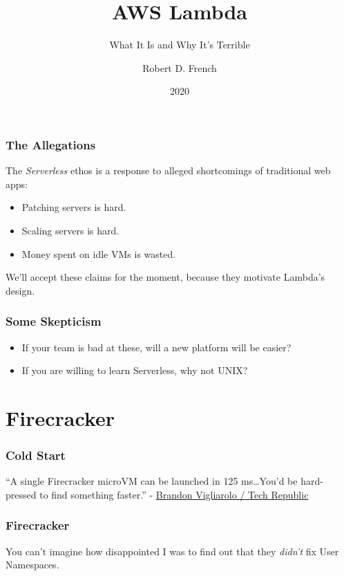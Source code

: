 \documentclass{beamer}
\title{AWS Lambda}
\subtitle{What It Is and Why It's Terrible}
\author{Robert D. French}
\institute{Old Man Yells at Cloud, Inc.}
\date{2020}
\begin{document}
\frame{\titlepage}

\begin{frame}
	\frametitle{The Allegations}
	The \emph{Serverless} ethos is a response to alleged shortcomings of traditional
	web apps:
	\begin{itemize}
		\pause \item Patching servers is hard.
		\pause \item Scaling servers is hard.
		\pause \item Money spent on idle VMs is wasted.
	\end{itemize}
	\pause
	We'll accept these claims for the moment, because they motivate Lambda's design.
\end{frame}

\begin{frame}
	\frametitle{Some Skepticism}
	\begin{itemize}
		\item If your team is bad at these, will a new platform will be easier?
		\pause \item If you are willing to learn Serverless, why not UNIX?
	\end{itemize}
\end{frame}
 
\section{Firecracker}
\frame{\sectionpage}

\begin{frame}
	\frametitle{Cold Start}
	``A single Firecracker microVM can be launched in 125 ms\ldots You'd be
	hard-pressed to find something faster.''
	- \href{https://www.techrepublic.com/article/aws-firecracker-10-things-every-tech-pro-should-know/}{Brandon Vigliarolo / Tech Republic}
\end{frame}

\begin{frame}
	\frametitle{Firecracker}
	You can't imagine how disappointed I was to find out that they \emph{didn't} fix
	User Namespaces.
\end{frame}
 
\end{document}
